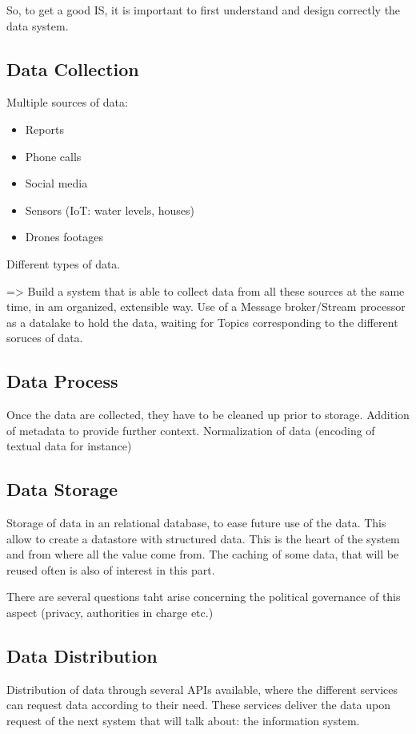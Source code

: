 So, to get a good IS, it is important to first understand and design correctly the data system.

\subsection{Data Collection}
Multiple sources of data:
\begin{itemize}
    \item Reports
    \item Phone calls
    \item Social media
    \item Sensors (IoT: water levels, houses)
    \item Drones footages
\end{itemize}
Different types of data.

=> Build a system that is able to collect data from all these sources at the same time, in am organized, extensible way.
Use of a Message broker/Stream processor as a datalake to hold the data, waiting for
Topics corresponding to the different soruces of data.

\subsection{Data Process}
Once the data are collected, they have to be cleaned up prior to storage.
Addition of metadata to provide further context.
Normalization of data (encoding of textual data for instance)

\subsection{Data Storage}
Storage of data in an relational database, to ease future use of the data.
This allow to create a datastore with structured data.
This is the heart of the system and from where all the value come from.
The caching of some data, that will be reused often is also of interest in this part.

There are several questions taht arise concerning the political governance of this aspect (privacy, authorities in charge etc.)

\subsection{Data Distribution}
Distribution of data through several APIs available, where the different services can request data according to their need.
These services deliver the data upon request of the next system that will talk about: the information system.

